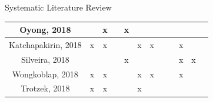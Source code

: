 \documentclass[aspectratio=169,10pt,xcolor={dvipsnames}]{beamer}
\begin{document}
\begin{frame}{Systematic Literature Review}
\begin{table}[]
{\begin{tabular}{c|c|c|c|c|c|c|ccc|c|c}
    Oyong, 2018 \cite{oyong_natural_2018}                         &                                                                 & x                 &                & x              &                                                                     &                       & \multicolumn{1}{c|}{}                  & \multicolumn{1}{c|}{}                                                               &               &                                                                  &                                                                         \\ \hline
    Katchapakirin, 2018 \cite{katchapakirin_facebook_2018}        & x                                                               & x                 &                &                & x                                                                   & x                     & \multicolumn{1}{c|}{}                  & \multicolumn{1}{c|}{}                                                               & x             &                                                                  &                                                                         \\ \hline
    Silveira, 2018 \cite{silveira_fraga_online_2018}              &                                                                 &                   &                & x              &                                                                     &                       & \multicolumn{1}{c|}{}                  & \multicolumn{1}{c|}{}                                                               & x             & x                                                                &                                                                         \\ \hline
    Wongkoblap, 2018 \cite{wongkoblap_multilevel_2018}            & x                                                               & x                 &                &                & x                                                                   & x                     & \multicolumn{1}{c|}{}                  & \multicolumn{1}{c|}{}                                                               & x             &                                                                  &                                                                         \\ \hline
    Trotzek, 2018 \cite{trotzek_utilizing_2018}                   & x                                                               & x                 &                &                & x                                                                   &                       & \multicolumn{1}{c|}{}                  & \multicolumn{1}{c|}{}                                                               &               &                                                                  &                                                                         \\ \hline

\end{tabular}}
\end{table}
\end{frame}
\end{document}
